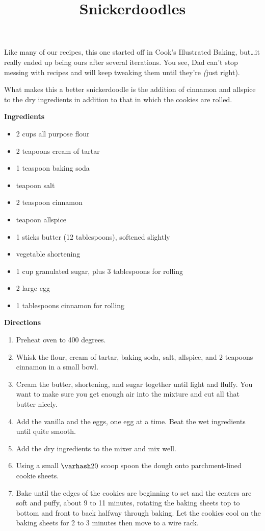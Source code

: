 \documentclass{article}
\title{Snickerdoodles}
\begin{document}
Like many of our recipes, this one started off in Cook's Illustrated Baking, but\dots it really
ended up being ours after several iterations. You see, Dad can't stop messing with recipes and will
keep tweaking them until they're \textit(just right).

What makes this a better snickerdoodle is the addition of cinnamon and allspice to the
dry ingredients in addition to that in which the cookies are rolled.

\textbf{Ingredients}

\begin{multicols}{2}
    \begin{itemize}
        \item 2 cups all purpose flour
        \item 2 teapoons cream of tartar
        \item 1 teaspoon baking soda
        \item {} teapoon salt
        \item 2 teaspoon cinnamon
        \item {} teapoon allspice

        \item 1 sticks butter (12 tablespoons), softened slightly
        \item {} vegetable shortening
        \item 1 cup granulated sugar, plus 3 tablespoons for rolling
        \item 2 large egg
        \item 1 tablespoons cinnamon for rolling
    \end{itemize}
\end{multicols}

\textbf{Directions}

\begin{enumerate}
    \item Preheat oven to 400 degrees.
    \item Whisk the flour, cream of tartar, baking soda, salt, allspice, and 2 teapoons cinnamon
          in a small bowl.
    \item Cream the butter, shortening, and sugar together until light and fluffy. You want to make sure you get
          enough air into the mixture and cut all that butter nicely.
    \item Add the vanilla and the eggs, one egg at a time. Beat the wet ingredients until quite smooth.
    \item Add the dry ingredients to the mixer and mix well.
    \item Using a small $\varhash 20$ scoop spoon the dough onto parchment-lined cookie sheets.
    \item Bake until the edges of the cookies are beginning to set and the centers are soft
          and puffy, about 9 to 11 minutes, rotating the baking sheets top to bottom and front
          to back halfway through baking. Let the cookies cool on the baking sheets for 2 to 3
          minutes then move to a wire rack.
\end{enumerate}

\medskip

\end{document}
